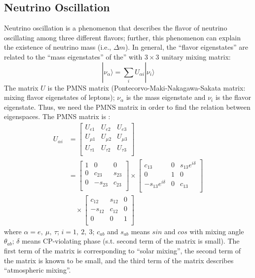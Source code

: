 \documentclass[12pt]{article}
\begin{document}
\begin{multicols}{2}
    \subsection{Neutrino Oscillation}
        Neutrino oscillation is a phenomenon that describes the flavor of neutrino oscillating among three different flavors; further, this phenomenon can explain the existence of neutrino mass (i.e., $\Delta m$). In general, the ``flavor eigenstates'' are related to the ``mass eigenstates'' of the'' with $3 \times 3$ unitary mixing matrix:
        \[
            | \nu_{\alpha} \rangle = \sum_{i} U_{\alpha i} | \nu_{i} \rangle
        \]
        The matrix $U$ is the PMNS matrix (Pontecorvo-Maki-Nakagawa-Sakata matrix: mixing flavor eigenstates of leptons); $\nu_\alpha$ is the mass eigenstate and $\nu_i$ is the flavor eigenstate. Thus, we need the PMNS matrix in order to find the relation between eigenspaces. The PMNS matrix is \cite{SKexp} \cite{wiki}:
        \begin{align*}
            U_{\alpha i} &= 
            \begin{bmatrix}
                U_{e1}     & U_{e2}     & U_{e3}    \\
                U_{\mu 1}  & U_{\mu 2}  & U_{\mu 3} \\
                U_{\tau 1} & U_{\tau 2} & U_{\tau 3}\\
            \end{bmatrix}\\
            &=
            \begin{bmatrix}
                1 & 0       & 0     \\
                0 & c_{23}  & s_{23}\\
                0 & -s_{23} & c_{23}\\
            \end{bmatrix}
            \times
            \begin{bmatrix}
                c_{13}             & 0 & s_{13}e^{i\delta}\\
                0                  & 1 & 0                \\
                -s_{13}e^{i\delta} & 0 & c_{13}           \\
            \end{bmatrix}\\
            &\quad \mathbin \times
            \begin{bmatrix}
                c_{12}  & s_{12} & 0\\
                -s_{12} & c_{12} & 0\\
                0       & 0      & 1\\
            \end{bmatrix}
        \end{align*}
        where $\alpha = e,\ \mu,\ \tau$; $i = 1,\ 2,\ 3$; $c_{ab}$ and $s_{ab}$ means $sin$ and $cos$ with mixing angle $\theta_{ab}$; $\delta$ means CP-violating phase (s.t. second term of the matrix is small). The first term of the matrix is corresponding to ``solar mixing'', the second term of the matrix is known to be small, and the third term of the matrix describes ``atmospheric mixing''.


\end{multicols}
\end{document}
